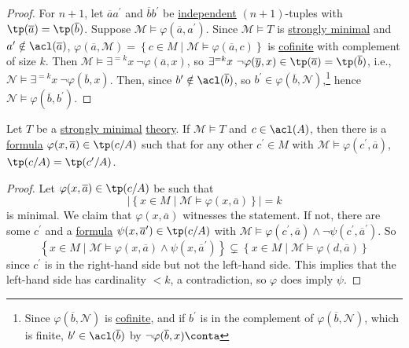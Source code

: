 \begin{proof}
	For \(n + 1\), let \(\overline{a} a^{\prime} \) and \(\overline{b} b^{\prime} \) be \hyperref[def:independent]{independent} \((n+1)\)-tuples with \(\tp(\overline{a} ) = \tp(\overline{b} )\). Suppose \(\mathcal{M} \models \varphi (\overline{a}, a^{\prime} )\). Since \(\mathcal{M} \models T\) is \hyperref[def:strongly-minimal]{strongly minimal} and \(a^{\prime} \notin\acl(\overline{a} )\), \(\varphi (\overline{a} , \mathcal{M} ) = \left\{ c\in M \mid \mathcal{M} \models \varphi (\overline{a} , c) \right\} \) is \hyperref[def:cofinite]{cofinite} with complement of size \(k\). Then \(\mathcal{M} \models \exists ^{=k}x\ \lnot \varphi (\overline{a} , x)\), so \(\exists ^{=k}x\ \lnot \varphi (\overline{y} , x) \in \tp(\overline{a} ) = \tp(\overline{b} )\), i.e., \(\mathcal{N} \models \exists ^{=k}x\ \lnot \varphi(\overline{b} , x) \). Then, since \(b^{\prime} \notin \acl(\overline{b} )\), so \(b^{\prime} \in \varphi (\overline{b} , \mathcal{N} )\),\footnote{Since \(\varphi (\overline{b} , \mathcal{N} )\) is \hyperref[def:cofinite]{cofinite}, and if \(b^{\prime} \) is in the complement of \(\varphi (\overline{b} , \mathcal{N} )\), which is finite, \(b^{\prime} \in \acl(\overline{b} )\) by \(\lnot \varphi (\overline{b} , x) \conta\)} hence \(\mathcal{N} \models \varphi (\overline{b} , b^{\prime} )\).
\end{proof}

\begin{lemma}\label{lma:lec19-2}
	Let \(T\) be a \hyperref[def:strongly-minimal]{strongly minimal} \hyperref[def:theory]{theory}. If \(\mathcal{M} \models T\) and \(c\in \acl(A)\), then there is a \hyperref[def:formula]{formula} \(\varphi (x, \overline{a} ) \in \tp(c / A)\) such that for any other \(c^{\prime} \in M\) with \(\mathcal{M} \models \varphi (c^{\prime} , \overline{a} )\), \(\tp(c / A) = \tp(c^{\prime} / A)\).
\end{lemma}
\begin{proof}
	Let \(\varphi (x, \overline{a} )\in \tp(c / A)\) be such that
	\[
		\vert \left\{ x\in M \mid \mathcal{M} \models \varphi (x, \overline{a} ) \right\}  \vert = k
	\]
	is minimal. We claim that \(\varphi (x, \overline{a} )\) witnesses the statement. If not, there are some \(c^{\prime} \) and a \hyperref[def:formula]{formula} \(\psi (x, \overline{a} ^{\prime} )\in \tp(c / A)\) with \(\mathcal{M} \models \varphi (c^{\prime} , \overline{a} ) \land \lnot \psi (c^{\prime} , \overline{a} ^{\prime} )\). So
	\[
		\left\{ x\in M \mid \mathcal{M} \models \varphi (x, \overline{a} ) \land \psi (x, \overline{a} ^{\prime} ) \right\}
		\subsetneq \left\{ x \in M \mid \mathcal{M} \models \varphi (d, \overline{a} ) \right\}
	\]
	since \(c^{\prime} \) is in the right-hand side but not the left-hand side. This implies that the left-hand side has cardinality \(< k\), a contradiction, so \(\varphi \) does imply \(\psi \).
\end{proof}

